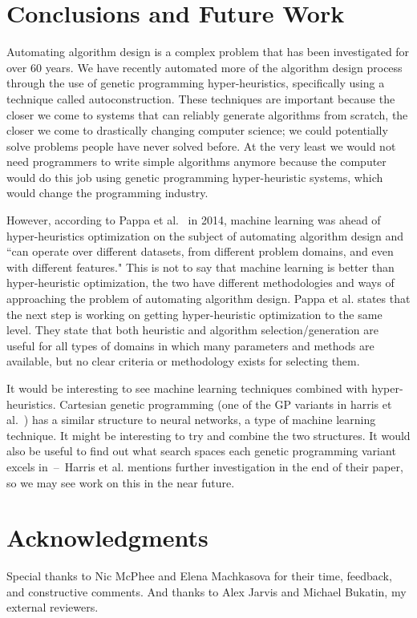 \documentclass{sig-alternate}
\begin{document}
\section{Conclusions and Future Work}
\label{sec:conclusion}
Automating algorithm design is a complex problem that has been investigated for over 60 years. We have recently automated more of the algorithm design process through the use of genetic programming hyper-heuristics, specifically using a technique called autoconstruction. These techniques are important because the closer we come to systems that can reliably generate algorithms from scratch, the closer we come to drastically changing computer science; we could potentially solve problems people have never solved before. At the very least we would not need programmers to write simple algorithms anymore because the computer would do this job using genetic programming hyper-heuristic systems, which would change the programming industry.

However, according to Pappa et al.~\cite{pappa:2014} in 2014, machine learning was ahead of hyper-heuristics optimization on the subject of automating algorithm design and ``can operate over different datasets, from different problem domains, and even with different features." This is not to say that machine learning is better than hyper-heuristic optimization, the two have different methodologies and ways of approaching the problem of automating algorithm design. Pappa et al. states that the next step is working on getting hyper-heuristic optimization to the same level. They state that both heuristic and algorithm selection/generation are useful for all types of domains in which many parameters and methods are available, but no clear criteria or methodology exists for selecting them.

It would be interesting to see machine learning techniques combined with hyper-heuristics. Cartesian genetic programming (one of the GP variants in harris et al.~\cite{harris:2015}) has a similar structure to neural networks, a type of machine learning technique. It might be interesting to try and combine the two structures. It would also be useful to find out what search spaces each genetic programming variant excels in~--~Harris et al. mentions further investigation in the end of their paper, so we may see work on this in the near future.

\section*{Acknowledgments}
\label{sec:acknowledgments}
Special thanks to Nic McPhee and Elena Machkasova for their time, feedback, and constructive comments. And thanks to Alex Jarvis and Michael Bukatin, my external reviewers.



  
\end{document}
